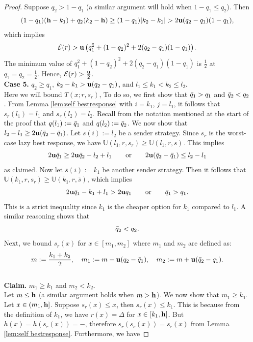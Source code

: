 \begin{proof}
        Suppose $q_2 > 1 - q_1$ (a similar argument will hold when $1 - q_1 \leq q_2$). Then
        \[
        (1 - q_1)(\mathbf{h} - k_1) + q_2(k_2 - \mathbf{h}) \geq (1 - q_1) |k_2 - k_1| > 2\mathbf{u}(q_2 - q_1)(1 - q_1),
        \]
        which implies
        \[
        \mathcal{E}(r) > \mathbf{u} \left(q_1^2 + (1 - q_2)^2 + 2(q_2 - q_1)(1 - q_1)\right).
        \]
        The minimum value of $q_1^2 + (1 - q_2)^2 + 2(q_2 - q_1)(1 - q_1)$ is $\frac{1}{2}$ at $q_1 = q_2 = \frac{1}{2}$. Hence, $\mathcal{E}(r) > \frac{\mathbf{u}}{2}$.\\
\textbf{Case 5. }{$q_2 \geq q_1$, $k_2 - k_1 > \mathbf{u}(q_2 - q_1)$, and $l_1 \leq k_1 < k_2 \leq l_2$.} \\
    Here we will bound $T(x;r,s_r)$, To do so, we first show that $\bar{q}_1 > q_1$ and $\bar{q}_2 < q_2$.
        From Lemma \ref{lem:self bestresponse} with $i = k_1$, $j = l_1$, it follows that $s_r(l_1) = l_1$ and $s_r(l_2) = l_2$. Recall from the notation mentioned at the start of the proof that $q(l_1) := \bar{q}_1$ and $q(l_2) := \bar{q}_2$. We now show that $l_2 - l_1 \geq 2\mathbf{u} (\bar{q}_2 - \bar{q}_1)$. Let $s(i) := l_2$ be a sender strategy. Since $s_r$ is the worst-case lazy best response, we have $\mathbb{U}(l_1, r, s_r) \geq \mathbb{U}(l_1, r, s)$. This implies
        \[
        2\mathbf{u} \bar{q}_1 \geq 2\mathbf{u} \bar{q}_2 - l_2 + l_1 \quad \hbox{\quad or\quad} \quad 2\mathbf{u} (\bar{q}_2 - \bar{q}_1) \leq l_2 - l_1
        \]
        as claimed.
        Now let $\bar{s}(i) := k_1$ be another sender strategy. Then it follows that $\mathbb{U}(k_1, r, s_r) \geq \mathbb{U}(k_1, r, \bar{s})$, which implies
        \begin{equation}\label{eqn:lem:bar greater}
            2\mathbf{u} \bar{q}_1 - k_1 + l_1 > 2\mathbf{u} q_1 \quad \hbox{\quad or\quad} \quad \bar{q}_1 > q_1.
        \end{equation}
        This is a strict inequality since $k_1$ is the cheaper option for $k_1$ compared to $l_1$. A similar reasoning shows that
        \begin{equation}\label{eqn:lem:bar lesser}
            \bar{q}_2 < q_2.
        \end{equation}
        Next, we bound $s_r(x)$ for $x \in [m_1,m_2]$ where $m_1$ and $m_2$ are defined as:
        \[
        m := \frac{k_1 + k_2}{2}, \quad m_1 := m - \mathbf{u}(q_2 - \bar{q}_1), \quad m_2 := m + \mathbf{u}(\bar{q}_2 - q_1).
        \]\\
        \textbf{Claim. } $m_1 \geq k_1$ and $m_2 < k_2$. \\
        Let $m \leq \mathbf{h}$ (a similar argument holds when $m > \mathbf{h}$). We now show that $m_1 \geq k_1$. Let $x \in (m_1, \mathbf{h}]$. Suppose $s_r(x) \leq x$, then $s_r(x) \leq k_1$. This is because from the definition of $k_1$, we have $r(x) = \Delta$ for $x \in [k_1, \mathbf{h}]$. But $h(x) = h(s_r(x)) = \minus$, therefore $s_r(s_r(x)) = s_r(x)$ from Lemma \ref{lem:self bestresponse}. Furthermore, we have

\end{proof}
